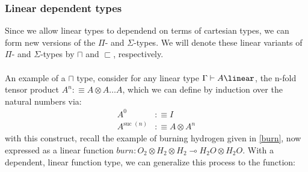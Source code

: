 \subsubsection{Linear dependent types}
Since we allow linear types to dependend on terms of cartesian types, we can form new versions of the $\Pi$- and $\Sigma$-types. We will denote these linear variants of $\Pi$- and $\Sigma$-types by $\sqcap$ and $\sqsubset$, respectively.\\
\\
An example of a $\sqcap$ type, consider for any linear type $\Gamma \vdash A \linear$, the n-fold tensor product $A^n :\equiv A \otimes A \dots A$, which we can define by induction over the natural numbers via:
\[
  \begin{split}
  A^0 &:\equiv I\\
  A^{\text{suc }(n)} &:\equiv A \otimes A^n
  \end{split}
\]
with this construct, recall the example of burning hydrogen given in \ref{burn}, now expressed as a linear function $burn : O_2 \otimes H_2 \otimes H_2 \multimap H_2O \otimes H_2O$. With a dependent, linear function type, we can generalize this process to the function:
